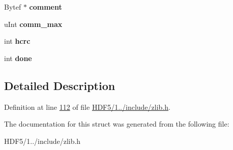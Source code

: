 \begin{DoxyCompactItemize}
Bytef $\ast$ {\bfseries comment}
\item 
\mbox{\label{structgz__header__s_aa0529f45e5c08b3009cfc2a61a86aea0}} 
u\+Int {\bfseries comm\+\_\+max}
\item 
\mbox{\label{structgz__header__s_a29fa8de3acff8d8c7bad61dc924d8564}} 
int {\bfseries hcrc}
\item 
\mbox{\label{structgz__header__s_ab8fd11f59b76a7d031e24bede8679d9d}} 
int {\bfseries done}
\end{DoxyCompactItemize}


\subsection{Detailed Description}


Definition at line \hyperlink{_h_d_f5_21_810_81_2include_2zlib_8h_source_l00112}{112} of file \hyperlink{_h_d_f5_21_810_81_2include_2zlib_8h_source}{H\+D\+F5/1../include/zlib.\+h}.



The documentation for this struct was generated from the following file\+:\begin{DoxyCompactItemize}
\item 
H\+D\+F5/1../include/zlib.\+h\end{DoxyCompactItemize}
